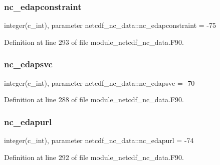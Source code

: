 \subsubsection{\texorpdfstring{nc\+\_\+edapconstraint}{nc\_edapconstraint}}
{\footnotesize\ttfamily integer(c\+\_\+int), parameter netcdf\+\_\+nc\+\_\+data\+::nc\+\_\+edapconstraint = -\/75}



Definition at line 293 of file module\+\_\+netcdf\+\_\+nc\+\_\+data.\+F90.

\mbox{\label{namespacenetcdf__nc__data_aef772139dee477b025ac854248d88196}} 
\subsubsection{\texorpdfstring{nc\+\_\+edapsvc}{nc\_edapsvc}}
{\footnotesize\ttfamily integer(c\+\_\+int), parameter netcdf\+\_\+nc\+\_\+data\+::nc\+\_\+edapsvc = -\/70}



Definition at line 288 of file module\+\_\+netcdf\+\_\+nc\+\_\+data.\+F90.

\mbox{\label{namespacenetcdf__nc__data_a01d48838e19e0e70af483d025747f856}} 
\subsubsection{\texorpdfstring{nc\+\_\+edapurl}{nc\_edapurl}}
{\footnotesize\ttfamily integer(c\+\_\+int), parameter netcdf\+\_\+nc\+\_\+data\+::nc\+\_\+edapurl = -\/74}



Definition at line 292 of file module\+\_\+netcdf\+\_\+nc\+\_\+data.\+F90.

\mbox{\label{namespacenetcdf__nc__data_ac5a55bad25b5ba22b277c485abd35d61}} 
